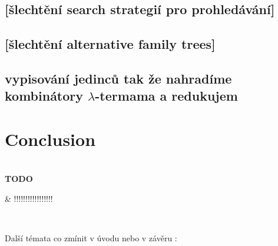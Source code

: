 \documentclass[12pt,a4paper]{report}
\newcommand{\lterm}{$\lambda$-term\xspace}
\newenvironment{todo}
{ ~\\[0.5em]
  {\color{red}\textbf{TODO}}
  \begin{easylist}[itemize]}
{ \end{easylist}
  ~}
\begin{document}
\section{[šlechtění search strategií pro prohledávání]}
\section{[šlechtění alternative family trees]}

\section{vypisování jedinců tak že nahradíme kombinátory \lterm{}ama a redukujem }



\chapter*{Conclusion}


\begin{todo}
 & !!!!!!!!!!!!!!!!!
\end{todo}


Další témata co zmínit v úvodu nebo v závěru :\\
\end{document}
